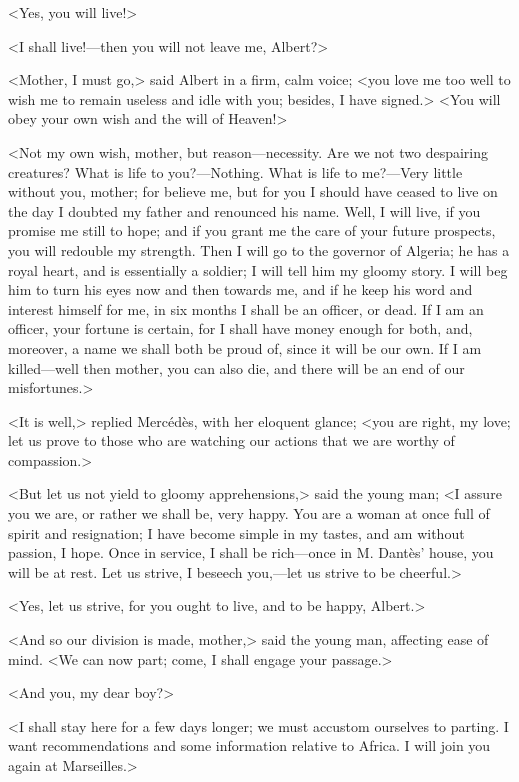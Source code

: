 <Yes, you will live!> 

 <I shall live!—then you will not leave me, Albert?> 

 <Mother, I must go,> said Albert in a firm, calm voice; <you love me too well to wish me to remain useless and idle with you; besides, I have signed.>  <You will obey your own wish and the will of Heaven!> 

 <Not my own wish, mother, but reason—necessity. Are we not two despairing creatures? What is life to you?—Nothing. What is life to me?—Very little without you, mother; for believe me, but for you I should have ceased to live on the day I doubted my father and renounced his name. Well, I will live, if you promise me still to hope; and if you grant me the care of your future prospects, you will redouble my strength. Then I will go to the governor of Algeria; he has a royal heart, and is essentially a soldier; I will tell him my gloomy story. I will beg him to turn his eyes now and then towards me, and if he keep his word and interest himself for me, in six months I shall be an officer, or dead. If I am an officer, your fortune is certain, for I shall have money enough for both, and, moreover, a name we shall both be proud of, since it will be our own. If I am killed—well then mother, you can also die, and there will be an end of our misfortunes.> 

 <It is well,> replied Mercédès, with her eloquent glance; <you are right, my love; let us prove to those who are watching our actions that we are worthy of compassion.> 

 <But let us not yield to gloomy apprehensions,> said the young man; <I assure you we are, or rather we shall be, very happy. You are a woman at once full of spirit and resignation; I have become simple in my tastes, and am without passion, I hope. Once in service, I shall be rich—once in M. Dantès' house, you will be at rest. Let us strive, I beseech you,—let us strive to be cheerful.> 

 <Yes, let us strive, for you ought to live, and to be happy, Albert.> 

 <And so our division is made, mother,> said the young man, affecting ease of mind. <We can now part; come, I shall engage your passage.> 

 <And you, my dear boy?> 

 <I shall stay here for a few days longer; we must accustom ourselves to parting. I want recommendations and some information relative to Africa. I will join you again at Marseilles.> 

